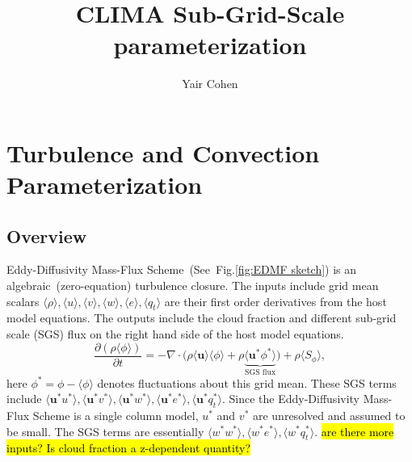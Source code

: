 \documentclass{report}
\title{CLIMA Sub-Grid-Scale parameterization}
\author{Yair Cohen}
\begin{document}
\maketitle
\tableofcontents

\chapter{Turbulence and Convection Parameterization}
\section{Overview}
Eddy-Diffusivity Mass-Flux Scheme~(See~Fig.\ref{fig:EDMF sketch}) is an algebraic~(zero-equation) turbulence closure. The inputs include grid mean scalars
$\langle \rho \rangle,  \langle u \rangle, \langle v \rangle, \langle w \rangle, \langle e \rangle, \langle q_t \rangle$ are their first order derivatives from the host model equations.
The outputs include the cloud fraction  and different sub-grid scale (SGS) flux  on the right hand side of the host model equations.
\begin{equation}
\label{eq:grid_mean_scalar} 
\frac{\partial (\rho \langle \phi \rangle)}{\partial t} = - \nabla \cdot \Big( \rho\langle \mathbf{u} \rangle \langle \phi \rangle + 
\rho \underbrace{\langle \mathbf{u}^* \phi^* \rangle}_{\text{SGS flux}}\Big) + \rho \langle S_{\phi} \rangle,
\end{equation}
here $\phi^* = \phi - \langle\phi \rangle$ denotes fluctuations about this grid mean. These SGS terms include
$\langle \mathbf{u}^* u^* \rangle, \langle \mathbf{u}^* v^* \rangle, \langle \mathbf{u}^* w^* \rangle, \langle \mathbf{u}^* e^* \rangle, \langle \mathbf{u}^* q_t^* \rangle$. 
Since the Eddy-Diffusivity Mass-Flux Scheme is a single column model, $u^{*}$ and $v^{*}$ are unresolved and assumed to be small. The SGS terms are essentially $\langle w^* w^* \rangle, \langle w^* e^* \rangle, \langle w^* q_t^* \rangle$.
\hl{are there more inputs? Is cloud fraction a z-dependent quantity?}
\end{document}
